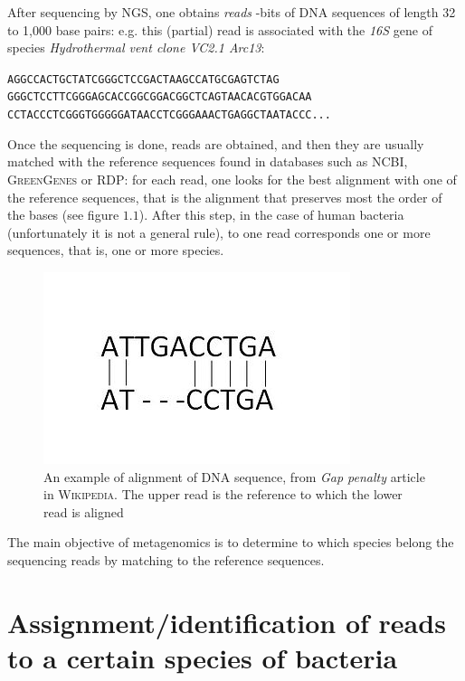 \documentclass{report}
\begin{document}
After sequencing by NGS, one obtains \emph{reads} -bits of DNA sequences of length 32 to 1,000 base pairs: e.g. this (partial) read is associated with the \emph{16S} gene of species \emph{Hydrothermal vent clone VC2.1 Arc13}:\\

\begin{center}
{\tt AGGCCACTGCTATCGGGCTCCGACTAAGCCATGCGAGTCTAG\\
GGGCTCCTTCGGGAGCACCGGCGGACGGCTCAGTAACACGTGGACAA\\
CCTACCCTCGGGTGGGGGATAACCTCGGGAAACTGAGGCTAATACCC...}\\
\end{center}

Once the sequencing is done, reads are obtained, and then they are usually matched with the reference sequences found in databases such as NCBI, \textsc{GreenGenes} or RDP: for each read, one looks for the best alignment with one of the reference sequences, that is the alignment that preserves most the order of the bases (see figure $1.1$). After this step, in the case of human bacteria (unfortunately it is not a general rule), to one read corresponds one or more sequences, that is, one or more species.\\

\begin{figure}[H]
\centering
\includegraphics[scale=0.5]{illustrations/Sequence_gaps.JPG}
\caption{An example of alignment of DNA sequence, from \emph{Gap penalty} article in \textsc{Wikipedia}. The upper read is the reference to which the lower read is aligned}
\end{figure}

The main objective of metagenomics is to determine to which species belong the sequencing reads by matching to the reference sequences.

\section{Assignment/identification of reads to a certain species of bacteria}
\end{document}
